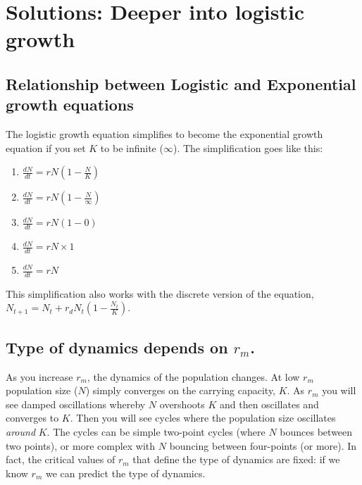 \documentclass[
  a4paper]{book}
\providecommand{\tightlist}{%
  \setlength{\itemsep}{0pt}\setlength{\parskip}{0pt}}
\begin{document}
\section{Solutions: Deeper into logistic growth}\label{solutions-deeper-into-logistic-growth}

\subsection{Relationship between Logistic and Exponential growth equations}\label{relationship-between-logistic-and-exponential-growth-equations}

The logistic growth equation simplifies to become the exponential growth equation if you set \(K\) to be infinite (\(\infty\)). The simplification goes like this:

\begin{enumerate}
\def\labelenumi{\arabic{enumi}.}
\tightlist
\item
  \(\frac{d N}{d t}=r N\left(1-\frac{N}{K}\right)\)
\item
  \(\frac{d N}{d t}=r N\left(1-\frac{N}{\infty}\right)\)
\item
  \(\frac{d N}{d t}=r N\left(1-0\right)\)
\item
  \(\frac{d N}{d t}=r N \times 1\)
\item
  \(\frac{d N}{d t}=r N\)
\end{enumerate}

This simplification also works with the discrete version of the equation, \(N_{t+1}=N_{t}+r_{d} N_{t}\left(1-\frac{N_{t}}{K}\right)\).

\subsection{\texorpdfstring{Type of dynamics depends on \(r_m\).}{Type of dynamics depends on r\_m.}}\label{type-of-dynamics-depends-on-r_m.}

As you increase \(r_m\), the dynamics of the population changes. At low \(r_m\) population size (\(N\)) simply converges on the carrying capacity, \(K\). As \(r_m\) you will see damped oscillations whereby \(N\) overshoots \(K\) and then oscillates and converges to \(K\). Then you will see cycles where the population size oscillates \emph{around} \(K\). The cycles can be simple two-point cycles (where \(N\) bounces between two points), or more complex with \(N\) bouncing between four-points (or more). In fact, the critical values of \(r_m\) that define the type of dynamics are fixed: if we know \(r_m\) we can predict the type of dynamics.
\end{document}
